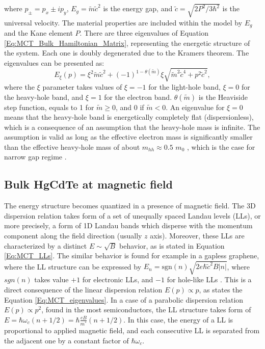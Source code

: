 \documentclass[titlepage,a4paper]{book}
\newcommand{\wciecie}{\quad\phantom{v}}
\begin{document}
where $p_{\pm} = p_x \pm ip_y$, $E_g = \tilde{m}\tilde{c}^2$ is the energy gap, and $\tilde{c} = \sqrt{2P^2 / 3 \hbar^2}$ is the universal velocity. The material properties are included within the model by $E_g$ and the Kane element $P$. There are three eigenvalues of Equation \ref{Eq:MCT_Bulk_Hamiltonian_Matrix}, representing the energetic structure of the system. Each one is doubly degenerated due to the Kramers theorem. The eigenvalues can be presented as:
\begin{equation}
\label{Eq:MCT_eigenvalues}
E_\xi (p) = \xi^2 \tilde{m}\tilde{c}^2 + (-1)^{1-\theta (\tilde{m})} \xi \sqrt{\tilde{m}^2\tilde{c}^4 + p^2\tilde{c}^2},
\end{equation}
where the $\xi$ parameter takes values of $\xi = -1$ for the light-hole band, $\xi = 0$ for the heavy-hole band, and $\xi = 1$ for the electron band. $\theta(\tilde{m})$ is the Heaviside step function, equals to 1 for $\tilde{m} \geq 0$, and 0 if $\tilde{m} < 0$. An eigenvalue for $\xi = 0$ means that the heavy-hole band is energetically completely flat (dispersionless), which is a consequence of an assumption that the heavy-hole mass is infinite. The assumption is valid as long as the effective electron mass is significantly smaller than the effective heavy-hole mass of about $m_{hh} \approx 0.5$ $m_0$ \cite{Weiler_MCT}, which is the case for narrow gap regime \cite{Orlita_MCT}. 

\subsection{Bulk HgCdTe at magnetic field}
\wciecie
The energy structure becomes quantized in a presence of magnetic field. The 3D dispersion relation takes form of a set of unequally spaced Landau levels (LLs), or more precisely, a form of 1D Landau bands which disperse with the momentum component along the field direction (usually $z$ axis). Moreover, these LLs are characterized by a distinct $E \sim \sqrt{B}$ behavior, as is stated in Equation \ref{Eq:MCT_LLs}. The similar behavior is found for example in a gapless graphene, where the LL structure can be expressed by $E_n = \mathrm{sgn}(n) \sqrt{2e\hbar \tilde{c}^2B|n|}$, where $sgn(n)$ takes value $+1$ for electronic LLs, and $-1$ for hole-like LLs \cite{Jiang_MCT}. This is a direct consequence of the linear dispersion relation $E(p) \propto p$, as states the Equation \ref{Eq:MCT_eigenvalues}. In a case of a parabolic dispersion relation $E(p) \propto p^2$, found in the most semiconductors, the LL structure takes form of $E = \hbar \omega_c(n + 1/2) = \hbar \frac{eB}{m^*}(n + 1/2)$. In this case, the energy of a LL is proportional to applied magnetic field, and each consecutive LL is separated from the adjacent one by a constant factor of $\hbar \omega_c$. 
\end{document}
